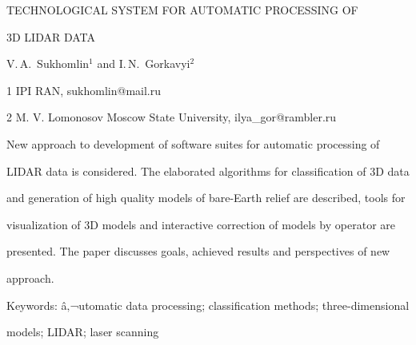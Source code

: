       


      


TECHNOLOGICAL SYSTEM FOR AUTOMATIC PROCESSING OF 


3D LIDAR DATA





V.\,A.~Sukhomlin$^1$ and I.\,N.~Gorkavyi$^2$





1 IPI RAN, sukhomlin@mail.ru


2 M. V. Lomonosov Moscow State University, ilya_gor@rambler.ru





New approach to development of software suites for automatic processing of 


LIDAR data is considered. The elaborated algorithms for classification of 3D data 


and generation of high quality models of bare-Earth relief are described, tools for 


visualization of 3D models and interactive correction of models by operator are 


presented. The paper discusses goals, achieved results and perspectives of new 


approach.





Keywords: â‚¬utomatic data processing; classification methods; three-dimensional 


models; LIDAR; laser scanning


